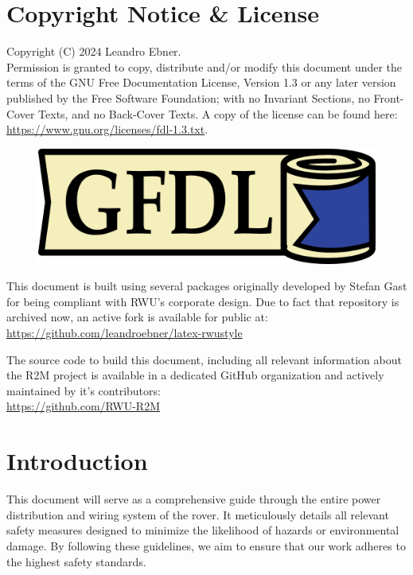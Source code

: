 \section{Copyright Notice \& License}

    Copyright (C)  2024 Leandro Ebner. \\
    Permission is granted to copy, distribute and/or modify this document under the terms of the GNU Free Documentation License, Version 1.3 or any later version published by the Free Software Foundation; with no Invariant Sections, no Front-Cover Texts, and no Back-Cover Texts. A copy of the license can be found here:
    \href{https://www.gnu.org/licenses/fdl-1.3.txt}{https://www.gnu.org/licenses/fdl-1.3.txt}.

    \begin{figure}[h!]
    \includegraphics{contents/figures/gfdl-logo.png}
    \end{figure}

    \vspace{5mm}
    

    This document is built using several packages originally developed by Stefan Gast for being compliant with RWU's corporate design. Due to fact that repository is archived now, an active fork is available for public at: \\
    \href{https://github.com/leandroebner/latex-rwustyle}{https://github.com/leandroebner/latex-rwustyle} 

    The source code to build this document, including all relevant information about the R2M project is available in a dedicated GitHub organization and actively maintained by it's contributors: \\
    \href{https://github.com/RWU-R2M}{https://github.com/RWU-R2M}

    
\section{Introduction}

    This document will serve as a comprehensive guide through the entire power distribution and wiring system of the rover. It meticulously details all relevant safety measures designed to minimize the likelihood of hazards or environmental damage. By following these guidelines, we aim to ensure that our work adheres to the highest safety standards. 

